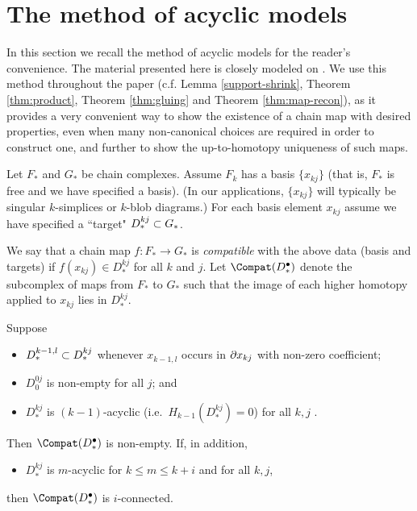
\section{The method of acyclic models}  \label{sec:moam}

In this section we recall the method of acyclic models for the reader's convenience. The material presented here is closely modeled on  \cite[Chapter 4]{MR0210112}.
We use this method throughout the paper (c.f. Lemma \ref{support-shrink}, Theorem \ref{thm:product}, Theorem \ref{thm:gluing} and Theorem \ref{thm:map-recon}), as it provides a very convenient way to show the existence of a chain map with desired properties, even when many non-canonical choices are required in order to construct one, and further to show the up-to-homotopy uniqueness of such maps.

Let $F_*$ and $G_*$ be chain complexes.
Assume $F_k$ has a basis $\{x_{kj}\}$
(that is, $F_*$ is free and we have specified a basis).
(In our applications, $\{x_{kj}\}$ will typically be singular $k$-simplices or 
$k$-blob diagrams.)
For each basis element $x_{kj}$ assume we have specified a ``target" $D^{kj}_*\subset G_*$.

We say that a chain map $f:F_*\to G_*$ is {\it compatible} with the above data (basis and targets)
if $f(x_{kj})\in D^{kj}_*$ for all $k$ and $j$.
Let $\Compat(D^\bullet_*)$ denote the subcomplex of maps from $F_*$ to $G_*$
such that the image of each higher homotopy applied to $x_{kj}$ lies in $D^{kj}_*$.

\begin{thm}  \label{moam-thm}
Suppose 
\begin{itemize}
\item $D^{k-1,l}_* \subset D^{kj}_*$ whenever $x_{k-1,l}$ occurs in $\partial x_{kj}$
with non-zero coefficient;
\item $D^{0j}_0$ is non-empty for all $j$; and
\item $D^{kj}_*$ is $(k{-}1)$-acyclic (i.e.\ $H_{k-1}(D^{kj}_*) = 0$) for all $k,j$ .
\end{itemize}
Then $\Compat(D^\bullet_*)$ is non-empty.
If, in addition,
\begin{itemize}
\item $D^{kj}_*$ is $m$-acyclic for $k\le m \le k+i$ and for all $k,j$,
\end{itemize}
then $\Compat(D^\bullet_*)$ is $i$-connected.
\end{thm}


